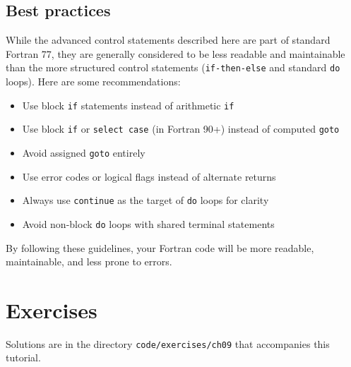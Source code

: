 \subsection{Best practices}

While the advanced control statements described here are part of standard Fortran 77, they are generally considered to be less readable and maintainable than the more structured control statements (\texttt{if-then-else} and standard \texttt{do} loops). Here are some recommendations:

\begin{itemize}
    \item Use block \texttt{if} statements instead of arithmetic \texttt{if}
    \item Use block \texttt{if} or \texttt{select case} (in Fortran 90+) instead of computed \texttt{goto}
    \item Avoid assigned \texttt{goto} entirely
    \item Use error codes or logical flags instead of alternate returns
    \item Always use \texttt{continue} as the target of \texttt{do} loops for clarity
    \item Avoid non-block \texttt{do} loops with shared terminal statements
\end{itemize}

By following these guidelines, your Fortran code will be more readable, maintainable, and less prone to errors.

\section{Exercises}

Solutions are in the directory \texttt{code/exercises/ch09} that accompanies this tutorial.

